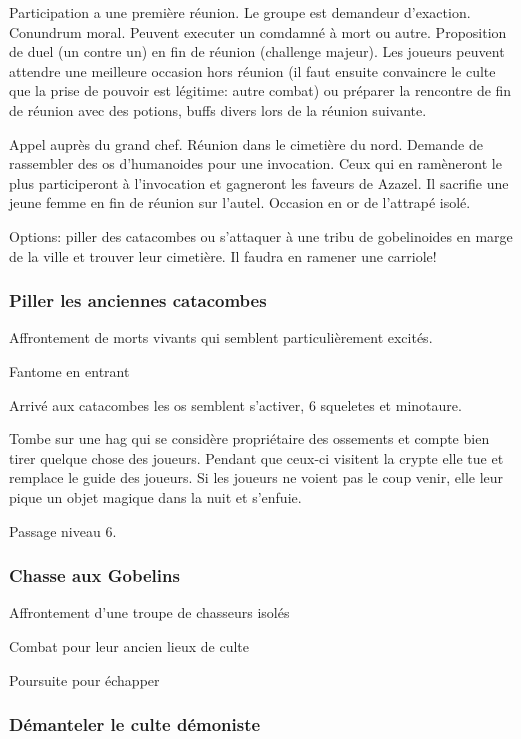 Participation a une première réunion.
Le groupe est demandeur d'exaction. Conundrum moral. Peuvent executer un comdamné à mort ou autre.
Proposition de duel (un contre un) en fin de réunion (challenge majeur). Les joueurs peuvent attendre une meilleure
occasion hors réunion (il faut ensuite convaincre le culte que la prise de 
pouvoir est légitime: autre combat) ou préparer la rencontre de fin de réunion avec des potions, buffs divers lors de la réunion suivante.


Appel auprès du grand chef. Réunion dans le cimetière du nord. Demande de rassembler des os d'humanoides 
pour une invocation. Ceux qui en ramèneront le plus participeront à l'invocation et gagneront les faveurs de Azazel.
Il sacrifie une jeune femme en fin de réunion sur l'autel.  Occasion en or de l'attrapé isolé.

Options: piller des catacombes ou s'attaquer à une tribu de gobelinoides en marge de la ville et trouver leur cimetière. Il faudra en ramener une carriole!

\subsubsection*{Piller les anciennes catacombes}

Affrontement de morts vivants qui semblent particulièrement excités.

Fantome en entrant

Arrivé aux catacombes les os semblent s'activer, 6 squeletes et minotaure.

Tombe sur une hag qui se considère propriétaire des ossements et compte bien tirer quelque chose des joueurs.
Pendant que ceux-ci visitent la crypte elle tue et remplace le guide des joueurs. Si les joueurs ne voient pas le coup
venir, elle leur pique un objet magique dans la nuit et s'enfuie.

Passage niveau 6.

\subsubsection*{Chasse aux Gobelins}

Affrontement d'une troupe de chasseurs isolés

Combat pour leur ancien lieux de culte 

Poursuite pour échapper

\subsubsection*{Démanteler le culte démoniste}

